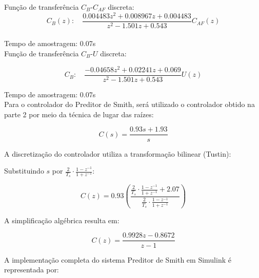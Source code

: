 \documentclass[a4paper,12pt]{article}
\begin{document}
Função de transferência $C_B$-$C_{AF}$ discreta:\\

\begin{equation}
C_B(z): \quad \frac{0.004483 z^2 + 0.008967 z + 0.004483}{z^2 - 1.501 z + 0.543}C_{AF}(z)
\end{equation}\\

Tempo de amostragem: 0.07s\\

Função de transferência $C_B$-$U$ discreta:

\begin{equation}
C_B: \quad \frac{-0.04658 z^2 + 0.02241 z + 0.069}{z^2 - 1.501 z + 0.543}U(z)
\end{equation}

Tempo de amostragem: 0.07s \\

Para o controlador do Preditor de Smith, será utilizado o controlador obtido na parte 2 por meio da técnica de lugar das raízes:

\begin{equation}
C(s) = \frac{0.93 s + 1.93}{s}
\label{eq:controlador_continuo}
\end{equation}

A discretização do controlador utiliza a transformação bilinear (Tustin):

Substituindo $s$ por $\frac{2}{T_s} \cdot \frac{1 - z^{-1}}{1 + z^{-1}}$:

\[
C(z) = 0.93\left(\frac{\frac{2}{T_s} \cdot \frac{1 - z^{-1}}{1 + z^{-1}} + 2.07}{\frac{2}{T_s} \cdot \frac{1 - z^{-1}}{1 + z^{-1}}}\right)
\]

A simplificação algébrica resulta em:

\begin{equation}
C(z) = \frac{0.9928z - 0.8672}{z-1}
\label{eq:controlador_discreto}
\end{equation}

A implementação completa do sistema Preditor de Smith em Simulink é representada por:
\end{document}
